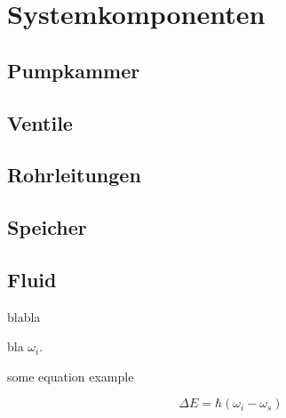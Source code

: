 \chapter{Systemkomponenten}
\label{sec:modelapproaches}


\section{Pumpkammer}
\label{sec:chamber}

\section{Ventile}
\label{sec:velves}

\section{Rohrleitungen}
\label{sec:tubes}

\section{Speicher}
\label{sec:reservoir}

\section{Fluid}
\label{sec:water}

blabla

bla $\omega_i$. 

some equation example

\begin{equation} \label{eq:energyshift}
\Delta E = \hbar (\omega_i - \omega_s)
\end{equation}
